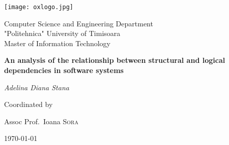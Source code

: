 \begin{titlepage}


\thispagestyle{empty}
\setlength\headheight{0pt} 
\begin{center}


\hfill \texttt{[image: oxlogo.jpg]}            


        \vspace{3cm}
        {\LARGE Computer Science and Engineering Department\\
"Politehnica" University of Timisoara\\ Master of Information Technology \par}
        \vspace{3cm}

        {\Large\bfseries An analysis of the relationship between structural and logical\\ dependencies in software systems \par}
        
        \vspace{3cm}
        {\Large\itshape Adelina Diana Stana\par}
        \vspace{0.25cm}

\vspace{1cm}
Coordinated by\par
Assoc Prof.~Ioana \textsc{Sora}\par
\vspace{1.5cm}
\large
\today

\end{center}

\clearpage
\restoregeometry
\end{titlepage}
